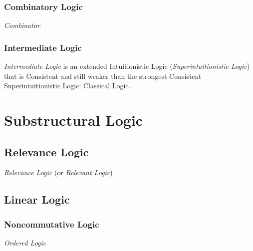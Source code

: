 \subsubsection{Combinatory Logic}\label{sec:combinatory_logic}

\emph{Combinator}



\subsubsection{Intermediate Logic}

\emph{Intermediate Logic} is an extended Intuitionistic Logic
(\emph{Superintuitionistic Logic}) that is Consistent and still weaker
than the strongest Consistent Superintuitionistic Logic: Classical
Logic.



\section{Substructural Logic}\label{sec:substructural_logic}

\subsection{Relevance Logic}\label{sec:relevance_logic}

\emph{Relevance Logic} (or \emph{Relevant Logic})



\subsection{Linear Logic}\label{sec:linear_logic}

\subsubsection{Noncommutative Logic}\label{sec:noncommutative_logic}

\emph{Ordered Logic}



